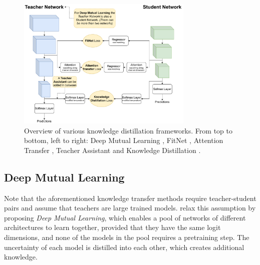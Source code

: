 \begin{figure}[htbp]
  \centering
  \includegraphics[width=0.75\textwidth]{chapter_sota/assets/kd_frameworks.pdf}
  \caption{Overview of various knowledge distillation frameworks. From top to
    bottom, left to right: Deep Mutual Learning
    \cite{DBLP:conf/cvpr/ZhangXHL18}, FitNet
    \cite{DBLP:journals/corr/RomeroBKCGB14}, Attention Transfer
    \cite{DBLP:conf/iclr/ZagoruykoK17}, Teacher Assistant
    \cite{DBLP:conf/aaai/MirzadehFLLMG20} and Knowledge Distillation
    \cite{DBLP:journals/corr/HintonVD15}.}
  \label{fig:sota:kd_frameworks}
\end{figure}

\subsection{Deep Mutual Learning}

Note that the aforementioned knowledge transfer methods require teacher-student
pairs and assume that teachers are large trained models.
\cite{DBLP:conf/cvpr/ZhangXHL18} relax this assumption by proposing \emph{Deep
Mutual Learning}, which enables a pool of networks of different architectures to
learn together, provided that they have the same logit dimensions, and none of
the models in the pool requires a pretraining step. The uncertainty of each
model is distilled into each other, which creates additional knowledge.\\

